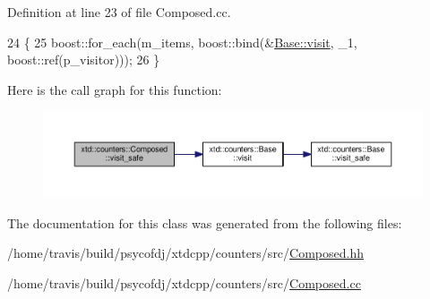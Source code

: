 Definition at line 23 of file Composed.\-cc.


\begin{DoxyCode}
24 \{
25   boost::for\_each(m\_items, boost::bind(&\hyperlink{classxtd_1_1counters_1_1Base_a0c743f0686dc24bada97c2ed31238c02}{Base::visit}, \_1, boost::ref(p\_visitor)));
26 \}
\end{DoxyCode}


Here is the call graph for this function\-:
\nopagebreak
\begin{figure}[H]
\begin{center}
\leavevmode
\includegraphics[width=350pt]{classxtd_1_1counters_1_1Composed_a0ef35ed872c3c19d29e2ecc3fa524474_cgraph}
\end{center}
\end{figure}




The documentation for this class was generated from the following files\-:\begin{DoxyCompactItemize}
\item 
/home/travis/build/psycofdj/xtdcpp/counters/src/\hyperlink{Composed_8hh}{Composed.\-hh}\item 
/home/travis/build/psycofdj/xtdcpp/counters/src/\hyperlink{Composed_8cc}{Composed.\-cc}\end{DoxyCompactItemize}
